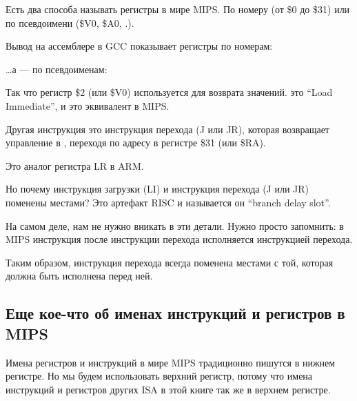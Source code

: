 \label{MIPS_leaf_function_ex1}
Есть два способа называть регистры в мире MIPS. По номеру (от \$0 до \$31) или по псевдоимени (\$V0, \$A0, \etc{}.).

Вывод на ассемблере в GCC показывает регистры по номерам:



\dots а \IDA --- по псевдоименам:



Так что регистр \$2 (или \$V0) используется для возврата значений.
 это ``Load Immediate'', и это эквивалент \MOV в MIPS.

Другая инструкция это инструкция перехода (J или JR), которая возвращает управление в , переходя по адресу в регистре \$31 (или \$RA).

Это аналог регистра \ac{LR} в ARM.

Но почему инструкция загрузки (LI) и инструкция перехода (J или JR) поменены местами? Это артефакт \ac{RISC} и называется он ``branch delay slot''.

На самом деле, нам не нужно вникать в эти детали. Нужно просто запомнить: в MIPS инструкция после инструкции перехода исполняется  инструкцией перехода.

Таким образом, инструкция перехода всегда поменена местами с той, которая должна быть исполнена перед ней.

\subsection{Еще кое-что об именах инструкций и регистров в MIPS}

Имена регистров и инструкций в мире MIPS традиционно пишутся в нижнем регистре.
Но мы будем использовать верхний регистр, потому что имена инструкций и регистров других \ac{ISA} в этой книге так же в верхнем регистре.

\fi %

